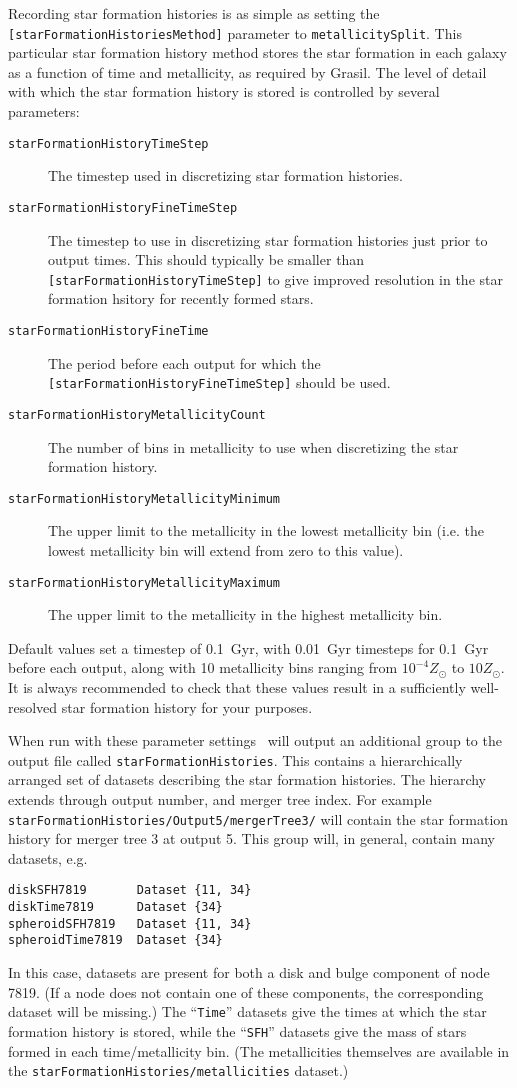 Recording star formation histories is as simple as setting the {\tt [starFormationHistoriesMethod]} parameter to {\tt metallicitySplit}. This particular star formation history method stores the star formation in each galaxy as a function of time and metallicity, as required by {\sc Grasil}. The level of detail with which the star formation history is stored is controlled by several parameters:
\begin{description}
\item [{\tt starFormationHistoryTimeStep}] The timestep used in discretizing star formation histories.
\item [{\tt starFormationHistoryFineTimeStep}] The timestep to use in discretizing star formation histories just prior to output times. This should typically be smaller than {\tt [starFormationHistoryTimeStep]} to give improved resolution in the star formation hsitory for recently formed stars.
\item [{\tt starFormationHistoryFineTime}] The period before each output for which the {\tt [starFormationHistoryFineTimeStep]} should be used.
\item [{\tt starFormationHistoryMetallicityCount}] The number of bins in metallicity to use when discretizing the star formation history.
\item [{\tt starFormationHistoryMetallicityMinimum}] The upper limit to the metallicity in the lowest metallicity bin (i.e. the lowest metallicity bin will extend from zero to this value).
\item [{\tt starFormationHistoryMetallicityMaximum}] The upper limit to the metallicity in the highest metallicity bin.
\end{description}
Default values set a timestep of 0.1~Gyr, with 0.01~Gyr timesteps for 0.1~Gyr before each output, along with 10 metallicity bins ranging from $10^{-4}Z_\odot$ to $10Z_\odot$. It is always recommended to check that these values result in a sufficiently well-resolved star formation history for your purposes.

When run with these parameter settings \glc\ will output an additional group to the output file called {\tt starFormationHistories}. This contains a hierarchically arranged set of datasets describing the star formation histories. The hierarchy extends through output number, and merger tree index. For example {\tt starFormationHistories/Output5/mergerTree3/} will contain the star formation history for merger tree 3 at output 5. This group will, in general, contain many datasets, e.g.
\begin{verbatim}
diskSFH7819       Dataset {11, 34}
diskTime7819      Dataset {34}
spheroidSFH7819   Dataset {11, 34}
spheroidTime7819  Dataset {34}
\end{verbatim}
In this case, datasets are present for both a disk and bulge component of node 7819. (If a node does not contain one of these components, the corresponding dataset will be missing.) The ``{\tt Time}'' datasets give the times at which the star formation history is stored, while the ``{\tt SFH}'' datasets give the mass of stars formed in each time/metallicity bin. (The metallicities themselves are available in the {\tt starFormationHistories/metallicities} dataset.)

